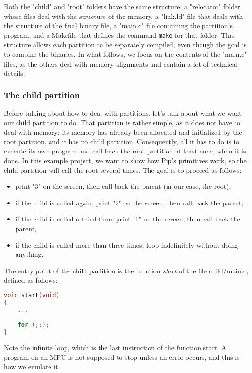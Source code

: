 \documentclass[10pt,a4paper,titlepage]{refart}
\begin{document}
Both the "child" and "root" folders have the same structure: a "relocator" folder whose files deal with the structure of the memory, 
a "link{.}ld" file that deals with the structure of the final binary file, a "main{.}c" file containing the partition's program, and 
a Makefile that defines the command \texttt{make} for that folder. This structure allows each partition to be separately compiled, 
even though the goal is to combine the binaries. In what follows, we focus on the contents of the "main{.}c" files, as the others 
deal with memory alignments and contain a lot of technical details.

\subsubsection{The child partition}


Before talking about how to deal with partitions, let's talk about what we want our child partition to do. That partition is rather 
simple, as it does not have to deal with memory: its memory has already been allocated and initialized by the root partition, and 
it has no child partition. Consequently, all it has to do is to execute its own program and call back the root partition at least 
once, when it is done. In this example project, we want to show how Pip's primitives work, so the child partition will call the 
root several times. The goal is to proceed as follows:
\begin{itemize}
    \item print "3" on the screen, then call back the parent (in our case, the root),
    \item if the child is called again, print "2" on the screen, then call back the parent,
    \item if the child is called a third time, print "1" on the screen, then call back the parent,
    \item if the child is called more than three times, loop indefinitely without doing anything.
\end{itemize}
The entry point of the child partition is the function \textit{start} of the file child/main{.}c, defined as follows:
\begin{lstlisting}[language=C]
void start(void)
{
    ...

	for (;;);
}
\end{lstlisting}
Note the infinite loop, which is the last instruction of the function start. A program on an MPU is not supposed to stop unless an error 
occurs, and this is how we emulate it.
\end{document}
